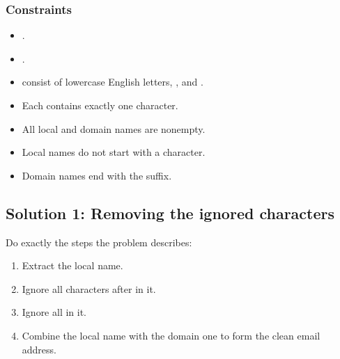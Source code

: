 \documentclass[letterpaper,12pt,english]{book}
\begin{document}
\subsubsection{Constraints}
\label{\detokenize{String/08_STR_929_Unique_Email_Addresses:constraints}}\begin{itemize}
\item {} 
\sphinxAtStartPar
{}.

\item {} 
\sphinxAtStartPar
{}.

\item {} 
\sphinxAtStartPar
{} consist of lowercase English letters, \sphinxcode{\sphinxupquote{\textquotesingle{}+\textquotesingle{}}},  and .

\item {} 
\sphinxAtStartPar
Each  contains exactly one  character.

\item {} 
\sphinxAtStartPar
All local and domain names are non\sphinxhyphen{}empty.

\item {} 
\sphinxAtStartPar
Local names do not start with a \sphinxcode{\sphinxupquote{\textquotesingle{}+\textquotesingle{}}} character.

\item {} 
\sphinxAtStartPar
Domain names end with the  suffix.

\end{itemize}


\subsection{Solution 1: Removing the ignored characters}
\label{\detokenize{String/08_STR_929_Unique_Email_Addresses:solution-1-removing-the-ignored-characters}}
\sphinxAtStartPar
Do exactly the steps the problem describes:
\begin{enumerate}
%
\item {} 
\sphinxAtStartPar
Extract the local name.

\item {} 
\sphinxAtStartPar
Ignore all characters after \sphinxcode{\sphinxupquote{\textquotesingle{}+\textquotesingle{}}} in it.

\item {} 
\sphinxAtStartPar
Ignore all  in it.

\item {} 
\sphinxAtStartPar
Combine the local name with the domain one to form the clean email address.

\end{enumerate}
\end{document}
